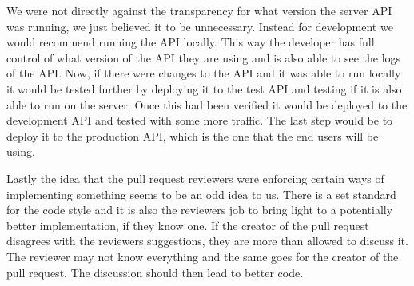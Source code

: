 We were not directly against the transparency for what version the server API was running, we just believed it to be unnecessary.
Instead for development we would recommend running the API locally.
This way the developer has full control of what version of the API they are using and is also able to see the logs of the API.
Now, if there were changes to the API and it was able to run locally it would be tested further by deploying it to the test API and testing if it is also able to run on the server.
Once this had been verified it would be deployed to the development API and tested with some more traffic.
The last step would be to deploy it to the production API, which is the one that the end users will be using.

Lastly the idea that the pull request reviewers were enforcing certain ways of implementing something seems to be an odd idea to us.
There is a set standard for the code style and it is also the reviewers job to bring light to a potentially better implementation, if they know one.
If the creator of the pull request disagrees with the reviewers suggestions, they are more than allowed to discuss it. 
The reviewer may not know everything and the same goes for the creator of the pull request.
The discussion should then lead to better code.
